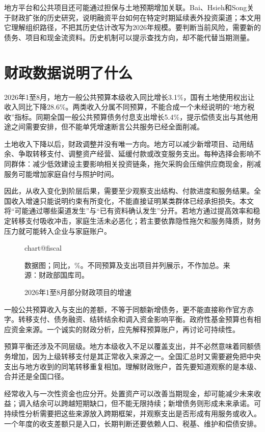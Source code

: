 \documentclass[UTF8,fontset=fandol,zihao=-4,oneside,openany]{ctexbook}
\makeatletter
\newcommand{\Chart}[3]{\begin{figure}[htbp]\centering\csname chart@#1\endcsname\caption{#2}\par\small #3\end{figure}}
\makeatother
\begin{document}
地方平台和公共项目还可能通过担保与土地预期增加关联。Bai、Hsieh和Song关于财政扩张的历史研究，说明融资平台如何在特定时期延续表外投资渠道；本文用它理解组织路径，不把其历史估计改写为2026年规模。要判断当前风险，需要新的债务、项目和现金流资料。历史机制可以提示查找方向，却不能代替当期测量。\cite{Bai2016}

\section{财政数据说明了什么}
2026年1至8月，地方一般公共预算本级收入同比增长3.1\%，国有土地使用权出让收入同比下降28.6\%。两类收入分属不同预算，不能合成一个未经说明的“地方税收”指标。同期全国一般公共预算债务付息支出增长5.4\%，提示偿债支出与其他用途之间需要安排，但不能单凭增速断言公共服务已经全面削减。\cite{Fiscal2026}

\label{arg:P126}
土地收入下降以后，财政调整并没有唯一方向。地方可以减少新增项目、动用结余、争取转移支付、调整资产经营、延缓付款或改变服务支出。每种选择会影响不同群体：减少低效建设主要影响相关投资链条，拖欠采购会压缩供应商现金，削减服务可能增加家庭自付与照护时间。

因此，从收入变化到阶层后果，需要至少观察支出结构、付款进度和服务结果。全国收入增速只能说明约束有所变化，不能直接证明某类群体已经承担损失。本文将“可能通过哪些渠道发生”与“已有资料确认发生”分开。若地方通过提高效率和稳定转移支付吸收冲击，家庭生活未必恶化；若主要依靠隐性拖欠和服务降质，财务压力就可能转入企业与家庭账户。

\Chart{fiscal}{2026年1至8月部分财政项目的增速}{数据图；同比，\%。不同预算及支出项目并列展示，不作加总。来源：财政部国库司。\cite{Fiscal2026}}

一般公共预算收入与支出的差额，不等于同额新增债务，更不能直接称作官方赤字。转移支付、债务融资、结转结余和调入资金影响平衡。政府性基金预算也有相应资金来源。一个诚实的财政分析，应先解释预算账户，再讨论可持续性。

\label{arg:P127}
预算平衡还涉及不同层级。地方本级收入不足以覆盖支出，并不必然意味着同额债务增加，因为上级转移支付是其正常收入来源之一。全国汇总时又需要避免把中央支出与地方收到的同笔转移重复相加。理解财政账户，首先要知道观察的是本级、合并还是全国口径。

经常收入与一次性资金也应分开。处置资产可以改善当期现金，却可能减少未来收益；调入结余可以跨越短期缺口，但不能无限持续；新增债务则形成未来承诺。可持续性分析需要把这些来源放入跨期框架，并观察支出是否形成有用服务或收入。一个年度的收支差额只是入口，长期判断还要依赖人口、税基、维护和偿债安排。
\end{document}
